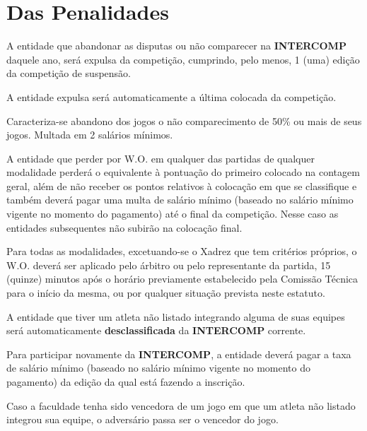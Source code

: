{\let\clearpage\relax \chapter{Das Penalidades}}

\begin{article}
	A entidade que abandonar as disputas ou não comparecer na \textbf{INTERCOMP} daquele ano, será expulsa da competição, cumprindo, pelo menos, 1 (uma) edição da competição de suspensão.

	\begin{xparagraph}
		A entidade expulsa será automaticamente a última colocada da competição.
	\end{xparagraph}

	\begin{xparagraph}
		Caracteriza-se abandono dos jogos o não comparecimento de 50\% ou mais de seus jogos. Multada em 2 salários mínimos.
	\end{xparagraph}
\end{article}

\begin{article}
	A entidade que perder por W.O. em qualquer das partidas de qualquer modalidade perderá o equivalente à pontuação do primeiro colocado na contagem geral, além de não receber os pontos relativos à colocação em que se classifique e também deverá pagar uma multa de  salário mínimo (baseado no salário mínimo vigente no momento do pagamento) até o final da competição. Nesse caso as entidades subsequentes não subirão na colocação final.

	\begin{xparagraph}
		Para todas as modalidades, excetuando-se o Xadrez que tem critérios próprios, o W.O. deverá ser aplicado pelo árbitro ou pelo representante da partida, 15 (quinze) minutos após o horário previamente estabelecido pela Comissão Técnica para o início da mesma, ou por qualquer situação prevista neste estatuto.
	\end{xparagraph}
\end{article}

\begin{article}
	A entidade que tiver um atleta não listado integrando alguma de suas equipes será automaticamente \textbf{desclassificada} da \textbf{INTERCOMP} corrente.

	\begin{xparagraph}
		Para participar novamente da \textbf{INTERCOMP}, a entidade deverá pagar a taxa de  salário mínimo (baseado no salário mínimo vigente no momento do pagamento) da edição da qual está fazendo a inscrição.
	\end{xparagraph}

	\begin{xparagraph}
		Caso a faculdade tenha sido vencedora de um jogo em que um atleta não listado integrou sua equipe, o adversário passa ser o vencedor do jogo.
	\end{xparagraph}
\end{article}

